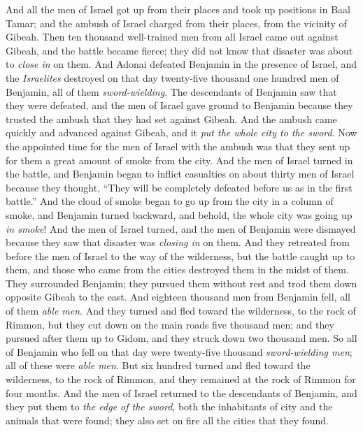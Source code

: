 \begin{biblechapter}
\verse And all the men of Israel got up from their places and took up positions in Baal Tamar; and the ambush of Israel charged from their places, from the vicinity of Gibeah.
\verse Then ten thousand well-trained men from all Israel came out against Gibeah, and the battle became fierce; they did not know that disaster was about to \textit{close in} on them.
\verse And Adonai defeated Benjamin in the presence of Israel, and the \textit{Israelites} destroyed on that day twenty-five thousand one hundred men of Benjamin, all of them \textit{sword-wielding}.
\verse The descendants of Benjamin saw that they were defeated, and the men of Israel gave ground to Benjamin because they trusted the ambush that they had set against Gibeah.
\verse And the ambush came quickly and advanced against Gibeah, and it \textit{put the whole city to the sword}.
\verse Now the appointed time for the men of Israel with the ambush was that they sent up for them a great amount of smoke from the city.
\verse And the men of Israel turned in the battle, and Benjamin began to inflict casualties on about thirty men of Israel because they thought, “They will be completely defeated before us as in the first battle.”
\verse And the cloud of smoke began to go up from the city in a column of smoke, and Benjamin turned backward, and behold, the whole city was going up \textit{in smoke}!
\verse And the men of Israel turned, and the men of Benjamin were dismayed because they saw that disaster was \textit{closing in} on them.
\verse And they retreated from before the men of Israel to the way of the wilderness, but the battle caught up to them, and those who came from the cities destroyed them in the midst of them.
\verse They surrounded Benjamin; they pursued them without rest and trod them down opposite Gibeah to the east.
\verse And eighteen thousand men from Benjamin fell, all of them \textit{able men}.
\verse And they turned and fled toward the wilderness, to the rock of Rimmon, but they cut down on the main roads five thousand men; and they pursued after them up to Gidom, and they struck down two thousand men.
\verse So all of Benjamin who fell on that day were twenty-five thousand \textit{sword-wielding men}; all of these were \textit{able men}.
\verse But six hundred turned and fled toward the wilderness, to the rock of Rimmon, and they remained at the rock of Rimmon for four months.
\verse And the men of Israel returned to the descendants of Benjamin, and they put them to \textit{the edge of the sword}, both the inhabitants of city and the animals that were found; they also set on fire all the cities that they found.
\end{biblechapter}

